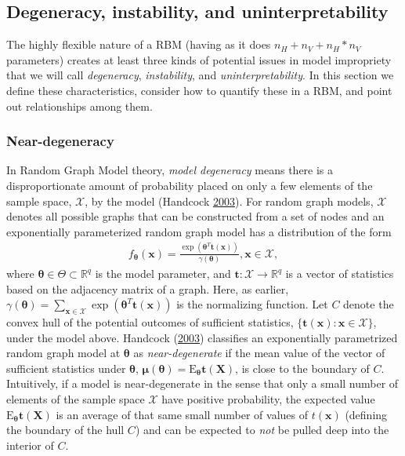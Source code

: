 \documentclass[12pt]{article}
\theoremstyle{definition}
\newcommand{\nv}{{n_{\scriptscriptstyle V}}}
\newcommand{\nh}{{n_{\scriptscriptstyle H}}}
\begin{document}
\subsection{Degeneracy, instability, and
uninterpretability}\label{degeneracy-instability-and-uninterpretability}

The highly flexible nature of a RBM (having as it does
\(\nh + \nv + \nh*\nv\) parameters) creates at least three kinds of
potential issues in model impropriety that we will call
\emph{degeneracy}, \emph{instability}, and \emph{uninterpretability}. In
this section we define these characteristics, consider how to quantify
these in a RBM, and point out relationships among them.

\subsubsection{Near-degeneracy}\label{near-degeneracy}

In Random Graph Model theory, \emph{model degeneracy} means there is a
disproportionate amount of probability placed on only a few elements of
the sample space, \(\mathcal{X}\), by the model (Handcock
\protect\hyperlink{ref-handcock2003assessing}{2003}). For random graph
models, \(\mathcal{X}\) denotes all possible graphs that can be
constructed from a set of nodes and an exponentially parameterized
random graph model has a distribution of the form
\begin{align*}
f_{\boldsymbol \theta} (\boldsymbol x) = \frac{\exp\left(\boldsymbol \theta^T \boldsymbol t(\boldsymbol x)\right)}{\gamma(\boldsymbol \theta)}, \boldsymbol x \in \mathcal{X},
\end{align*}
where \(\boldsymbol \theta \in \Theta \subset \mathbb{R}^q\) is the
model parameter, and
\(\boldsymbol t: \mathcal{X} \rightarrow \mathbb{R}^q\) is a vector of
statistics based on the adjacency matrix of a graph. Here, as earlier,
\(\gamma(\boldsymbol \theta) = \sum_{\boldsymbol x \in \mathcal{X}} \exp\left(\boldsymbol \theta^T \boldsymbol t(\boldsymbol x)\right)\)
is the normalizing function. Let \(C\) denote the convex hull of the
potential outcomes of sufficient statistics,
\(\{\boldsymbol t(\boldsymbol x): \boldsymbol x \in \mathcal{X}\}\),
under the model above. Handcock
(\protect\hyperlink{ref-handcock2003assessing}{2003}) classifies an
exponentially parametrized random graph model at \(\boldsymbol \theta\)
as \emph{near-degenerate} if the mean value of the vector of sufficient
statistics under \(\boldsymbol \theta\),
\(\boldsymbol \mu(\boldsymbol \theta) = \text{E}_{\boldsymbol \theta}\boldsymbol t( \boldsymbol X)\),
is close to the boundary of \(C\). Intuitively, if a model is
near-degenerate in the sense that only a small number of elements of the
sample space \(\mathcal{X}\) have positive probability, the expected
value \(\text{E}_{\boldsymbol \theta}\boldsymbol t( \boldsymbol X)\) is
an average of that same small number of values of \(t( \boldsymbol x)\)
(defining the boundary of the hull \(C\)) and can be expected to
\emph{not} be pulled deep into the interior of \(C\).
\end{document}
